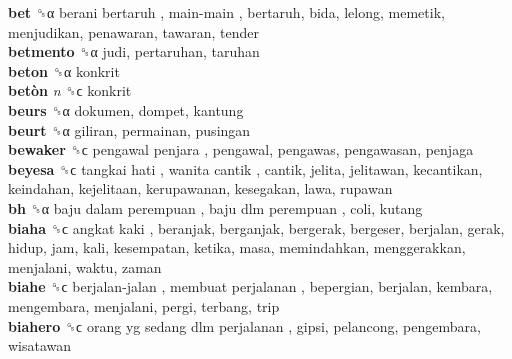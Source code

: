 \textbf{bet} ␝α   berani bertaruh ,  main-main , bertaruh, bida, lelong, memetik, menjudikan, penawaran, tawaran, tender  \\
\textbf{betmento} ␝α  judi, pertaruhan, taruhan  \\
\textbf{beton} ␝α  konkrit  \\
\textbf{betòn} \emph{n}  ␝ϲ  konkrit  \\
\textbf{beurs} ␝α  dokumen, dompet, kantung  \\
\textbf{beurt} ␝α  giliran, permainan, pusingan  \\
\textbf{bewaker} ␝ϲ   pengawal penjara , pengawal, pengawas, pengawasan, penjaga  \\
\textbf{beyesa} ␝ϲ   tangkai hati ,  wanita cantik , cantik, jelita, jelitawan, kecantikan, keindahan, kejelitaan, kerupawanan, kesegakan, lawa, rupawan  \\
\textbf{bh} ␝α   baju dalam perempuan ,  baju dlm perempuan , coli, kutang  \\
\textbf{biaha} ␝ϲ   angkat kaki , beranjak, berganjak, bergerak, bergeser, berjalan, gerak, hidup, jam, kali, kesempatan, ketika, masa, memindahkan, menggerakkan, menjalani, waktu, zaman  \\
\textbf{biahe} ␝ϲ   berjalan-jalan ,  membuat perjalanan , bepergian, berjalan, kembara, mengembara, menjalani, pergi, terbang, trip  \\
\textbf{biahero} ␝ϲ   orang yg sedang dlm perjalanan , gipsi, pelancong, pengembara, wisatawan  \\
